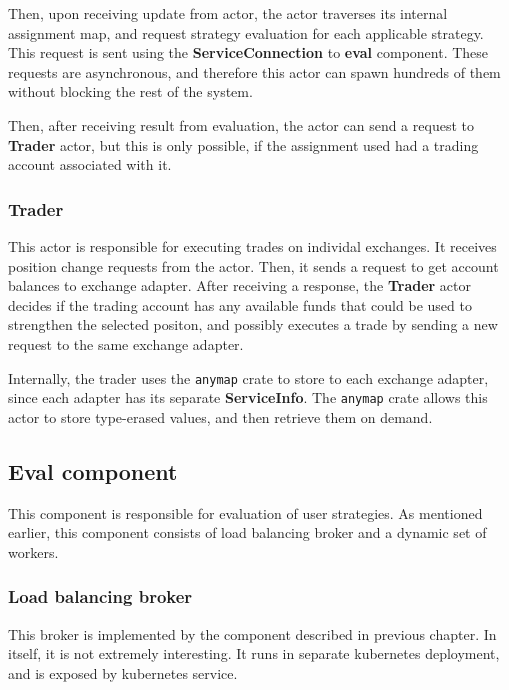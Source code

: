 Then, upon receiving update from  actor, the  actor traverses its internal
assignment map, and request strategy evaluation for each applicable strategy. This request is sent using
the \textbf{ServiceConnection} to \textbf{eval} component. These requests are asynchronous, and therefore
this actor can spawn hundreds of them without blocking the rest of the system.

Then, after receiving result from evaluation, the actor can send a request to \textbf{Trader} actor,
but this is only possible, if the assignment used had a trading account associated with it.

\subsubsection{Trader}
This actor is responsible for executing trades on individal exchanges. It receives position change requests from the 
actor. Then, it sends a request to get account balances to exchange adapter. After receiving a response, the
\textbf{Trader} actor decides if the trading account has any available funds that could be used to strengthen
the selected positon, and possibly executes a trade by sending a new request to the same exchange adapter.

Internally, the trader uses the \verb|anymap| crate to store  to each exchange
adapter, since each adapter has its separate \textbf{ServiceInfo}. The \verb|anymap| crate allows
this actor to store type-erased values, and then retrieve them on demand.

\subsection{Eval component}
This component is responsible for evaluation of user strategies. As mentioned earlier, this component consists
of load balancing broker and a dynamic set of workers.

\subsubsection{Load balancing broker}
This broker is implemented by the  component described in previous chapter. In itself,
it is not extremely interesting. It runs in separate kubernetes deployment, and is exposed by kubernetes service.

